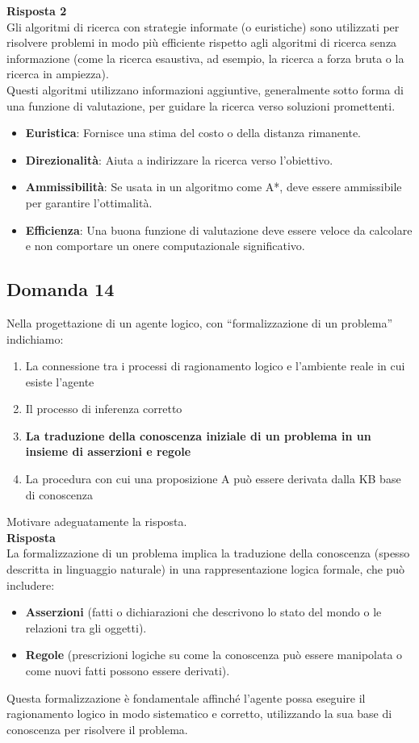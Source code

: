 \documentclass[../main.tex]{subfiles}
\begin{document}
	\textbf{Risposta 2}\\
	Gli algoritmi di ricerca con strategie informate (o euristiche) sono utilizzati per risolvere problemi in modo più efficiente rispetto agli algoritmi di ricerca senza informazione (come la ricerca esaustiva, ad esempio, la ricerca a forza bruta o la ricerca in ampiezza).\\
	Questi algoritmi utilizzano informazioni aggiuntive, generalmente sotto forma di una funzione di valutazione, per guidare la ricerca verso soluzioni promettenti.
	\begin{itemize}
		\item \textbf{Euristica}: Fornisce una stima del costo o della distanza rimanente.
		\item \textbf{Direzionalità}: Aiuta a indirizzare la ricerca verso l'obiettivo.
		\item \textbf{Ammissibilità}: Se usata in un algoritmo come A*, deve essere ammissibile per garantire l'ottimalità.
		\item \textbf{Efficienza}: Una buona funzione di valutazione deve essere veloce da calcolare e non comportare un onere computazionale significativo.
	\end{itemize}
	\subsection{Domanda 14}
	Nella progettazione di un agente logico, con “formalizzazione di un problema” indichiamo:
	\begin{enumerate}
		\item 	La connessione tra i processi di ragionamento logico e l'ambiente reale in cui esiste l'agente 
		\item Il processo di inferenza corretto 
		\item \textbf{La traduzione della conoscenza iniziale di un problema in un insieme di asserzioni e regole}
		\item La procedura con cui una proposizione A può essere derivata dalla KB base di conoscenza 
	\end{enumerate}
	Motivare adeguatamente la risposta.\\
	\textbf{Risposta}\\
	La formalizzazione di un problema implica la traduzione della conoscenza (spesso descritta in linguaggio naturale) in una rappresentazione logica formale, che può includere:
	\begin{itemize}
		\item \textbf{Asserzioni} (fatti o dichiarazioni che descrivono lo stato del mondo o le relazioni tra gli oggetti).
		\item \textbf{Regole} (prescrizioni logiche su come la conoscenza può essere manipolata o come nuovi fatti possono essere derivati).
	\end{itemize}
	Questa formalizzazione è fondamentale affinché l'agente possa eseguire il ragionamento logico in modo sistematico e corretto, utilizzando la sua base di conoscenza per risolvere il problema.
\end{document}
